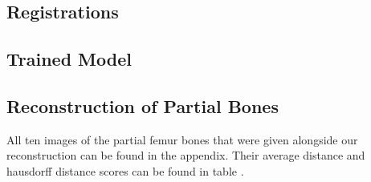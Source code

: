 \subsection{Registrations}

\subsection{Trained Model}

\subsection{Reconstruction of Partial Bones}
All ten images of the partial femur bones that were given alongside our reconstruction can be found in the appendix. Their average distance and hausdorff distance scores can be found in table  .
